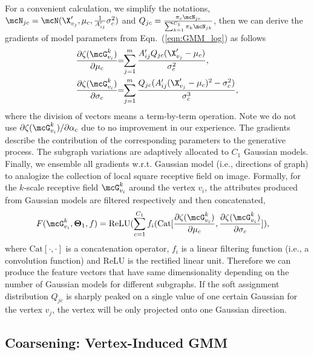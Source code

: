 \documentclass[letterpaper]{article} \usepackage{aaai19}  \usepackage{times}  \usepackage{helvet}  \usepackage{courier}  \usepackage{url}  \usepackage{graphicx}  \frenchspacing  \setlength{\pdfpagewidth}{8.5in}  \setlength{\pdfpageheight}{11in}
\def\ie{{i.e.}} \def\etal{{et.al}}
\def\bsigma{\mathbf{\sigma}}
\begin{document}
For a convenient calculation, we simplify the notations, $\mcN_{jc} = \mcN(\X'_{v_j}, \bmu_c, \frac{1}{A'_{ij}}\bsigma_c^2)$ and $ Q_{jc}=\frac{\pi_c\mcN_{jc} }{\sum_{k=1}^{C_1}\pi_k\mcN_{jk}}$, then we can derive the gradients of model parameters from Eqn.~(\ref{eqn:GMM_log}) as follows
\begin{align}
&\frac{\partial \zeta(\mcG_{v_i}^k)}{\partial\bmu_c}  \!\!=\!\! \sum_{j=1}^m\frac{A'_{ij}Q_{jc}(\X'_{v_j}-\bmu_c)}{\bsigma_c^2}, \quad \nonumber \\
&\frac{\partial \zeta(\mcG_{v_i}^k)}{\partial\bsigma_c}  \!\!=\!\! \sum_{j=1}^m \frac{Q_{jc}(A'_{ij}(\X'_{v_j}-\bmu_c)^2-\bsigma_c^2)}{\bsigma_c^3},
\end{align} 
where the division of vectors means a term-by-term operation. Note we do not use $\partial \zeta(\mcG_{v_i}^k) / \partial\alpha_c$ due to no improvement in our experience. The gradients describe the contribution of the corresponding parameters to the generative process. The subgraph variations are adaptively allocated to $C_1$ Gaussian models. Finally, we ensemble all gradients w.r.t. Gaussian model (\ie, directions of graph) to analogize the collection of local square receptive field on image. Formally, for the $k$-scale receptive field $\mcG_{v_i}^k$ around the vertex $v_i$, the attributes produced from Gaussian models are filtered respectively and then concatenated,
\begin{align}
F(\mcG_{v_i}^k,\bTheta_1,f) &= \text{ReLU}(\sum_{c=1}^{C_1} f_i(\text{Cat}[\frac{\partial \zeta(\mcG_{v_i}^k)}{\partial\bmu_c},\frac{\partial \zeta(\mcG_{v_i}^k)}{\partial\bsigma_c}]), \label{eqn:gau_fea}
\end{align}
where $\text{Cat}[\cdot, \cdot]$ is a concatenation operator, $f_i$ is a linear filtering function (\ie, a convolution function) and ReLU is the rectified linear unit. Therefore we can produce the feature vectors that have same dimensionality depending on the number of Gaussian models for different subgraphs. If the soft assignment distribution $ Q_{jc} $ is sharply peaked on a single value of one certain Gaussian for the vertex $v_{j}$, the vertex will be only projected onto one Gaussian direction.

\subsection{Coarsening: Vertex-Induced GMM}
\end{document}
